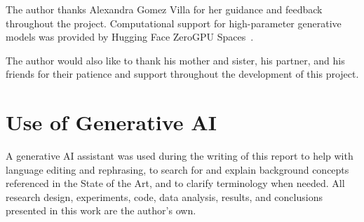 \documentclass[10pt,twocolumn]{article}
\begin{document}
The author thanks Alexandra Gomez Villa for her guidance and feedback throughout
the project. Computational support for high-parameter generative models was provided
by Hugging Face ZeroGPU Spaces~\cite{zerogpu}.

The author would also like to thank his mother and sister, his partner, and his friends
for their patience and support throughout the development of this project.

\section*{Use of Generative AI}

A generative AI assistant was used during the writing of this report to help with
language editing and rephrasing, to search for and explain background concepts
referenced in the State of the Art, and to clarify terminology when needed. All research
design, experiments, code, data analysis, results, and conclusions presented in this work
are the author's own.


\end{document}
